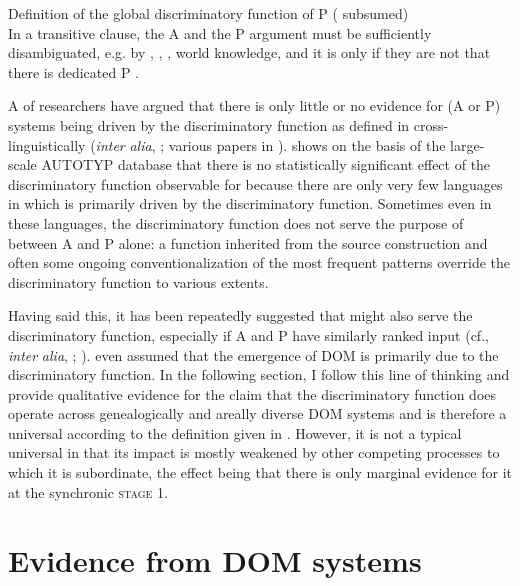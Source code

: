 \documentclass[output=paper]{langsci/langscibook}
\begin{document}
\ea\label{ex:serzant:3}
Definition of the global discriminatory function of P  ( subsumed)\\
In a transitive clause, the A and the P argument must be sufficiently disambiguated, e.g. by , , , world knowledge, and it is only if they are not that there is dedicated P .\\
\z

A  of researchers have argued that there is only little or no evidence for (A or P)  systems being driven by the discriminatory function as defined in  cross-linguistically (\textit{inter} \textit{alia}, \citealt{Aissen2003,Malchukov2008}; various papers in \citealt{deHoopdeSwart2009}). \citet{Levshina2018_Effic} shows on the basis of the large-scale AUTOTYP database that there is no statistically significant effect of the discriminatory function observable for  because there are only very few languages in which  is primarily driven by the discriminatory function. Sometimes even in these languages, the discriminatory function does not serve the purpose of  between A and P alone: a function inherited from the source construction and often some ongoing conventionalization of the most frequent  patterns override the discriminatory function to various extents. 

Having said this, it has been repeatedly suggested that  might also serve the discriminatory function, especially if A and P have similarly ranked input (cf., \textit{inter} \textit{alia}, \citealt{Comrie1978,Comrie1989}; \citealt{Dixon1994,Silverstein1976,Kibrik1997}). \citet[117]{Bossong1985} even assumed that the emergence of DOM is primarily due to the discriminatory function. In the following section, I follow this line of thinking and provide qualitative evidence for the claim that the discriminatory function does operate across genealogically and areally diverse DOM systems and is therefore a universal according to the definition given in . However, it is not a typical universal in that its impact is mostly weakened by other competing processes to which it is subordinate, the effect being that there is only marginal evidence for it at the synchronic \textsc{stage} 1.

\section{Evidence from DOM systems}\label{sec:serzant:3}
\end{document}
